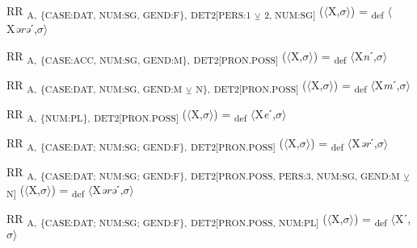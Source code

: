 {\begin{exe}
 RR \textsubscript{A,} \textsubscript{\{CASE:DAT, NUM:SG, GEND:F\},} \textsubscript{DET2[PERS:1} \textsubscript{${\veebar}$}\textsubscript{ 2, NUM:SG]} ($\langle$X,$\sigma $$\rangle$) = \textsubscript{def} $\langle$X\textit{ərə}ˊ,$\sigma $$\rangle$
\end{exe}

\begin{exe}
 RR \textsubscript{A,} \textsubscript{\{CASE:ACC, NUM:SG, GEND:M\},} \textsubscript{DET2[PRON.POSS]} ($\langle$X,$\sigma $$\rangle$) = \textsubscript{def} $\langle$X\textit{n}ˊ,$\sigma $$\rangle$
\end{exe}

\begin{exe}
 RR \textsubscript{A,} \textsubscript{\{CASE:DAT, NUM:SG, GEND:M} \textsubscript{${\veebar}$}\textsubscript{ N\},} \textsubscript{DET2[PRON.POSS]} ($\langle$X,$\sigma $$\rangle$) = \textsubscript{def} $\langle$X\textit{m}ˊ,$\sigma $$\rangle$
\end{exe}

\begin{exe}
 RR \textsubscript{A,} \textsubscript{\{NUM:PL\},} \textsubscript{DET2[PRON.POSS]} ($\langle$X,$\sigma $$\rangle$) = \textsubscript{def} $\langle$X\textit{e}ˊ,$\sigma $$\rangle$
\end{exe}

\begin{exe}
 RR \textsubscript{A,} \textsubscript{\{CASE:DAT; NUM:SG; GEND:F\},} \textsubscript{DET2[PRON.POSS]} ($\langle$X,$\sigma $$\rangle$) = \textsubscript{def} $\langle$X\textit{ər}ˊ,$\sigma $$\rangle$
\end{exe}

\begin{exe}
 RR \textsubscript{A,} \textsubscript{\{CASE:DAT; NUM:SG; GEND:F\},} \textsubscript{DET2[PRON.POSS, PERS:3, NUM:SG, GEND:M} \textsubscript{${\veebar}$}\textsubscript{ N]} ($\langle$X,$\sigma $$\rangle$) = \textsubscript{def} $\langle$X\textit{ərə}ˊ,$\sigma $$\rangle$
\end{exe}

\begin{exe}
 RR \textsubscript{A,} \textsubscript{\{CASE:DAT; NUM:SG; GEND:F\},} \textsubscript{DET2[PRON.POSS, NUM:PL]} ($\langle$X,$\sigma $$\rangle$) = \textsubscript{def} $\langle$Xˊ,$\sigma $$\rangle$
\end{exe}

}
